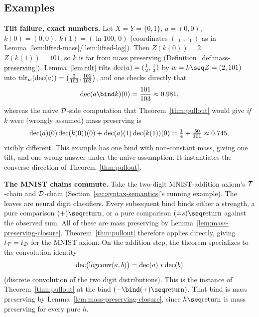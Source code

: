 \subsection{Examples}  %
\label{sec:examples}


\textbf{Tilt failure, exact numbers.} Let $X = Y = \{0,1\}$, $a = (0,0)$, $k(0) = (0,0)$,
$k(1) = (\ln 100,\, 0)$ (coordinates $(\cdot_0,\cdot_1)$ as in
Lemma~\ref{lem:lifted-mass}/\ref{lem:lifted-log}). Then $Z(k(0)) = 2$,
$Z(k(1)) = 101$, so $k$ is far from mass preserving
(Definition~\ref{def:mass-preserving}). Lemma~\ref{lem:tilt} tilts
$\mathrm{dec}(a) = (\tfrac12,\tfrac12)$ by $w = k\seq Z = (2,101)$ into
$\mathrm{tilt}_w(\mathrm{dec}(a)) = \bigl(\tfrac{2}{103}, \tfrac{101}{103}\bigr)$, and
one checks directly that
\[
  \dec(a \bind k)(0) = \frac{101}{103} \approx 0.981,
\]
whereas the naive $\mathcal D$-side computation that Theorem~\ref{thm:pullout}
would give \emph{if} $k$ were (wrongly assumed) mass preserving is
\[
  \mathrm{dec}(a)(0)\,\mathrm{dec}(k(0))(0) + \mathrm{dec}(a)(1)\,\mathrm{dec}(k(1))(0)
  = \tfrac14 + \tfrac{50}{101} \approx 0.745,
\]
visibly different. This example has one bind with non-constant mass,
giving one tilt, and one wrong answer under the naive assumption. It
instantiates the converse direction of Theorem~\ref{thm:pullout}.

\textbf{The MNIST chains commute.} Take the two-digit MNIST-addition
axiom's $\mathcal T$-chain and $\mathcal D$-chain
(Section~\ref{sec:syntax-semantics}'s running example). The leaves are
neural digit classifiers. Every subsequent bind binds either a
strength, a pure comparison $({+})\seq\Ret$, or a pure comparison
$({=}s)\seq\Ret$ against the observed sum. All of these are mass
preserving by Lemma~\ref{lem:mass-preserving-closure}.
Theorem~\ref{thm:pullout} therefore applies directly, giving
$t_{\mathcal T} = t_{\mathcal D}$ for the MNIST axiom. On the addition step, the
theorem specializes to the convolution identity
\[
  \mathrm{dec}\bigl(\mathrm{logconv}(a,b)\bigr) = \mathrm{dec}(a) * \mathrm{dec}(b)
\]
(discrete convolution of the two digit distributions). This is the
instance of Theorem~\ref{thm:pullout} at the bind
$({-}\bind ({+})\seq\Ret)$. That bind is mass preserving by
Lemma~\ref{lem:mass-preserving-closure}, since $h\seq\Ret$ is mass
preserving for every pure $h$.


